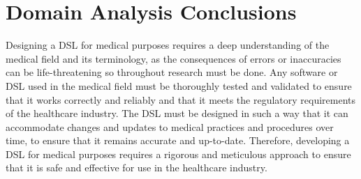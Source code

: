 \vspace{0.5cm}
\section*{Domain Analysis Conclusions}

Designing a DSL for medical purposes requires a deep understanding of the medical field and its terminology, as the consequences of errors or inaccuracies can be life-threatening so throughout research must be done.
Any software or DSL used in the medical field must be thoroughly tested and validated to ensure that it works correctly and reliably and that it meets the regulatory requirements of the healthcare industry. The DSL must be designed in such a way that it can accommodate changes and updates to medical practices and procedures over time, to ensure that it remains accurate and up-to-date. Therefore, developing a DSL for medical purposes requires a rigorous and meticulous approach to ensure that it is safe and effective for use in the healthcare industry.
